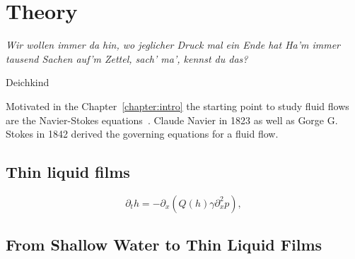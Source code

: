 \chapter{Theory}
\label{chapter:theory}
\epigraph{\textit{Wir wollen immer da hin, wo jeglicher Druck mal ein Ende hat
Ha'm immer tausend Sachen auf'm Zettel, sach' ma', kennst du das?}}{Deichkind}

Motivated in the Chapter~\ref{chapter:intro} the starting point to study fluid flows are the Navier-Stokes equations~\cite{Navier, Stokes}.
Claude Navier in 1823 as well as Gorge G. Stokes in 1842 derived the governing equations for a fluid flow.

\section{Thin liquid films}
\label{sec:thin_films}
\begin{equation}\label{eq:simple_thin_film}
    \partial_t h = -\partial_x\left(Q(h)\gamma\partial_x^2 p\right),
\end{equation}

\section{From Shallow Water to Thin Liquid Films}
\label{sec:theory_thin_film}

